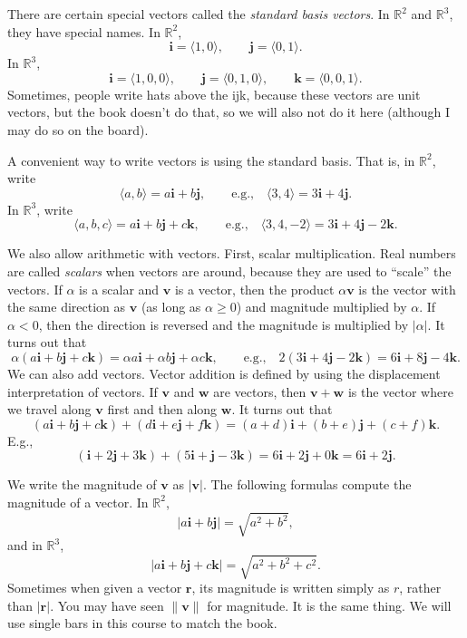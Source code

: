 \documentclass[12pt]{article}
\newcommand{\sabs}[1]{\lvert {#1} \rvert}
\newcommand{\snorm}[1]{\lVert {#1} \rVert}
\newcommand{\R}{{\mathbb{R}}}
\newcommand{\veci}{\mathbf{i}}
\newcommand{\vecj}{\mathbf{j}}
\newcommand{\veck}{\mathbf{k}}
\begin{document}
There are certain special vectors called the
\emph{standard basis vectors}.
In $\R^2$ and $\R^3$, they have special names.
In $\R^2$,
\[
\veci = \langle 1 , 0 \rangle, \qquad
\vecj = \langle 0 , 1 \rangle.
\]
In $\R^3$,
\[
\veci = \langle 1, 0, 0 \rangle, \qquad
\vecj = \langle 0, 1, 0 \rangle, \qquad
\veck = \langle 0, 0, 1 \rangle.
\]
Sometimes, people write hats above the ijk,
because these vectors are
unit vectors, but the book doesn't do that, so we will also not do it
here (although I may do so on the board).

A convenient way to write vectors is using the standard basis.
That is, in $\R^2$, write
\[
\langle a,b \rangle = a \veci + b \vecj,
\qquad \text{e.g.,} \quad
\langle 3,4 \rangle = 3 \veci + 4 \vecj.
\]
In $\R^3$, write
\[
\langle a,b,c \rangle = a \veci + b \vecj + c \veck,
\qquad \text{e.g.,} \quad
\langle 3,4,-2 \rangle = 3 \veci + 4 \vecj - 2 \veck.
\]

We also allow arithmetic with vectors.
First, scalar multiplication.
Real numbers are called \emph{scalars} when vectors are around,
because they are used to ``scale'' the vectors.
If $\alpha$ is a scalar and $\mathbf{v}$
is a vector, then the product $\alpha\mathbf{v}$ is the vector with the same direction as
$\mathbf{v}$ (as long as $\alpha \geq 0$) and magnitude multiplied by $\alpha$.
If $\alpha < 0$, then the direction is reversed and the magnitude is multiplied by
$\sabs{\alpha}$.
It turns out that
\[
\alpha ( a \veci + b \vecj + c \veck ) =
\alpha a \veci + \alpha b \vecj + \alpha c \veck,
\qquad \text{e.g.,} \quad
2 ( 3 \veci + 4 \vecj - 2 \veck ) =
6 \veci + 8 \vecj - 4 \veck
.
\]
We can also add vectors.
Vector addition is defined by using the displacement interpretation of vectors.
If $\mathbf{v}$ and $\mathbf{w}$ are vectors,
then $\mathbf{v}+\mathbf{w}$ is the vector where we travel along $\mathbf{v}$ first
and then along $\mathbf{w}$.
It turns out that
\[
( a \veci + b \vecj + c \veck ) +
( d \veci + e \vecj + f \veck ) =
(a+d) \veci + (b+e) \vecj + (c+f) \veck .
\]
E.g.,
\[
( \veci + 2 \vecj + 3 \veck ) +
( 5 \veci + \vecj - 3 \veck ) =
6 \veci + 2 \vecj + 0 \veck = 6 \veci + 2 \vecj
.
\]

We write the magnitude of $\mathbf{v}$ as
$\sabs{\mathbf{v}}$.
The following formulas compute the magnitude of a vector.
In $\R^2$,
\[
\sabs{a \veci + b \vecj}
=
\sqrt{a^2+b^2} ,
\]
and in $\R^3$,
\[
\sabs{a \veci + b \vecj + c \veck}
=
\sqrt{a^2+b^2+c^2} .
\]
Sometimes when given a vector $\mathbf{r}$, its magnitude is written simply as
$r$, rather than $\sabs{\mathbf{r}}$.
You may have seen $\snorm{\mathbf{v}}$ for magnitude. 
It is the same thing.
We will use single bars in this course to
match the book.
\end{document}

